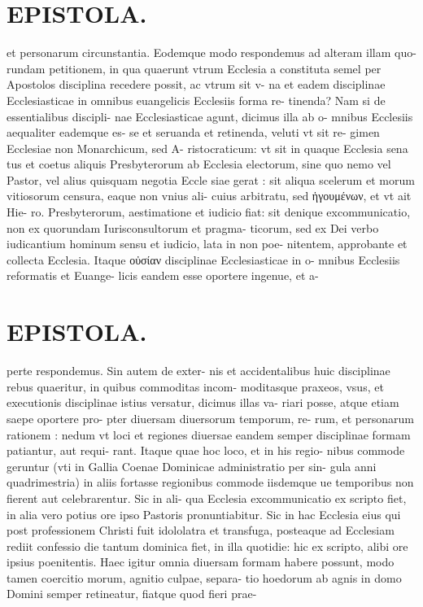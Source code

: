 \documentclass{article}
\begin{document}
\begin{pages}
\section*{EPISTOLA. }\pstart et personarum circunstantia. Eodemque modo respondemus ad alteram illam quo- rundam petitionem, in qua quaerunt vtrum Ecclesia a constituta semel per Apostolos disciplina recedere possit, ac vtrum sit v- na et eadem disciplinae Ecclesiasticae in omnibus euangelicis Ecclesiis forma re- tinenda? Nam si de essentialibus discipli- nae Ecclesiasticae agunt, dicimus illa ab o- mnibus Ecclesiis aequaliter eademque es- se et seruanda et retinenda, veluti vt sit re- gimen Ecclesiae non Monarchicum, sed A- ristocraticum: vt sit in quaque Ecclesia sena tus et coetus aliquis Presbyterorum ab Ecclesia electorum, sine quo nemo vel Pastor, vel alius quisquam negotia Eccle siae gerat : sit aliqua scelerum et morum vitiosorum censura, eaque non vnius ali- cuius arbitratu, sed ἡγουμένων, et vt ait Hie- ro. Presbyterorum, aestimatione et iudicio fiat: sit denique excommunicatio, non ex quorundam Iurisconsultorum et pragma- ticorum, sed ex Dei verbo iudicantium hominum sensu et iudicio, lata in non poe- nitentem, approbante et collecta Ecclesia. Itaque οὐσίαν disciplinae Ecclesiasticae in o- mnibus Ecclesiis reformatis et Euange- licis eandem esse oportere ingenue, et a-  \pend
\section*{EPISTOLA. }\pstart perte respondemus. Sin autem de exter- nis et accidentalibus huic disciplinae rebus quaeritur, in quibus commoditas incom- moditasque praxeos, vsus, et executionis disciplinae istius versatur, dicimus illas va- riari posse, atque etiam saepe oportere pro- pter diuersam diuersorum temporum, re- rum, et personarum rationem : nedum vt loci et regiones diuersae eandem semper disciplinae formam patiantur, aut requi- rant. Itaque quae hoc loco, et in his regio- nibus commode geruntur (vti in Gallia Coenae Dominicae administratio per sin- gula anni quadrimestria) in aliis fortasse regionibus commode iisdemque ue temporibus non fierent aut celebrarentur. Sic in ali- qua Ecclesia excommunicatio ex scripto fiet, in alia vero potius ore ipso Pastoris pronuntiabitur. Sic in hac Ecclesia eius qui post professionem Christi fuit idololatra et transfuga, posteaque ad Ecclesiam rediit confessio die tantum dominica fiet, in illa quotidie: hic ex scripto, alibi ore ipsius poenitentis. Haec igitur omnia diuersam formam habere possunt, modo tamen coercitio morum, agnitio culpae, separa- tio hoedorum ab agnis in domo Domini semper retineatur, fiatque quod fieri prae-  \pend

\end{pages}
\end{document}
